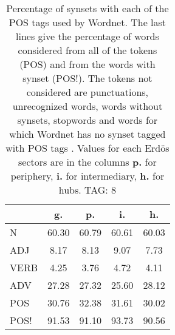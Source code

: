 \begin{table}[h!]
\begin{center}
\begin{tabular}{| l | c | c | c | c |}\hline
 & g. & p. & i. & h. \\\hline
N & 60.30  & 60.79  & 60.61  & 60.03 \\\hline
ADJ & 8.17  & 8.13  & 9.07  & 7.73 \\\hline
VERB & 4.25  & 3.76  & 4.72  & 4.11 \\\hline
ADV & 27.28  & 27.32  & 25.60  & 28.12 \\\hline
POS & 30.76  & 32.38  & 31.61  & 30.02 \\\hline
POS! & 91.53  & 91.10  & 93.73  & 90.56 \\\hline
\end{tabular}
\caption{Percentage of synsets with each of the POS tags used by Wordnet. The last lines give the percentage of words considered from all of the tokens (POS) and from the words with synset (POS!). The tokens not considered are punctuations, unrecognized words, words without synsets, stopwords and words for which Wordnet has no synset  tagged with POS tags . Values for each Erd\"os sectors are in the columns {{\bf p.}} for periphery, {{\bf i.}} for intermediary, {{\bf h.}} for hubs. TAG: 8}
\end{center}
\end{table}